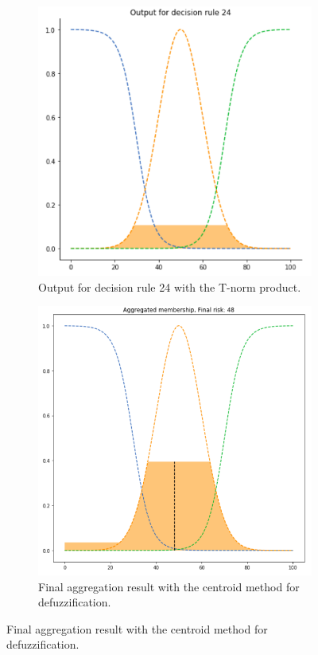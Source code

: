 \begin{figure}[ht]
\begin{subfigure}{.5\textwidth}
  \centering
  \includegraphics[width=.8\linewidth]{figures/third/prod3.png}  
  \caption{Output for decision rule 24 with the T-norm product.}
  \label{fig:3prod3}
\end{subfigure}
\begin{subfigure}{.5\textwidth}
  \centering
  \includegraphics[width=.8\linewidth]{figures/third/prod-centroid.png}  
  \caption{Final aggregation result with the centroid method for defuzzification.}
  \label{fig:3prod-centroid}
\end{subfigure}

\end{figure}
